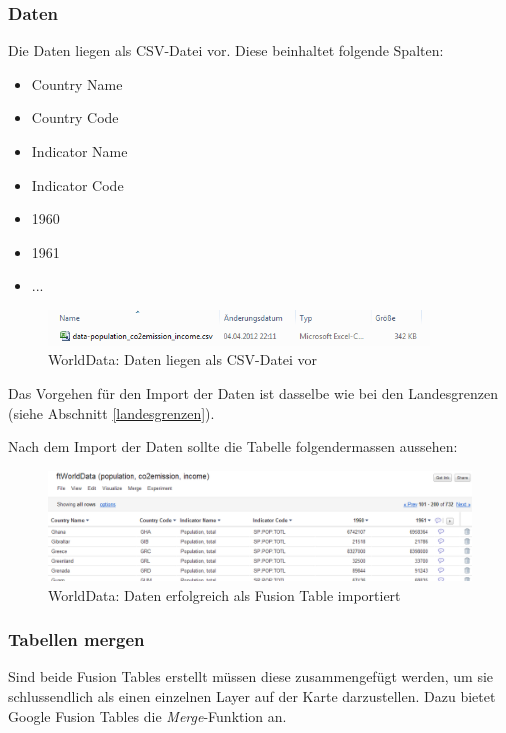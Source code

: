 \subsubsection{Daten}
Die Daten liegen als \gls{CSV}-Datei vor. Diese beinhaltet folgende Spalten:
\begin{itemize}
\item Country Name
\item Country Code
\item Indicator Name
\item Indicator Code
\item 1960
\item 1961
\item ...
\end{itemize}

\begin{figure}[H]
	\centering
	\includegraphics[width=0.9\textwidth]{images/usecase1-worlddata/documentation/worlddata-data_csv}
	\caption{WorldData: Daten liegen als CSV-Datei vor}
	\label{worlddata-data_csv}
\end{figure}

Das Vorgehen für den Import der Daten ist dasselbe wie bei den Landesgrenzen (siehe Abschnitt \ref{landesgrenzen}).

Nach dem Import der Daten sollte die Tabelle folgendermassen aussehen:

\begin{figure}[H]
	\centering
	\includegraphics[width=\textwidth]{images/usecase1-worlddata/documentation/worlddata-data_import_done}
	\caption{WorldData: Daten erfolgreich als Fusion Table importiert}
	\label{worlddata-data_import_done}
\end{figure}

\subsubsection{Tabellen mergen}
Sind beide Fusion Tables erstellt müssen diese zusammengefügt werden, um sie schlussendlich als einen einzelnen Layer auf der Karte darzustellen. Dazu bietet Google Fusion Tables die \emph{\gls{Merge}}-Funktion an. 


